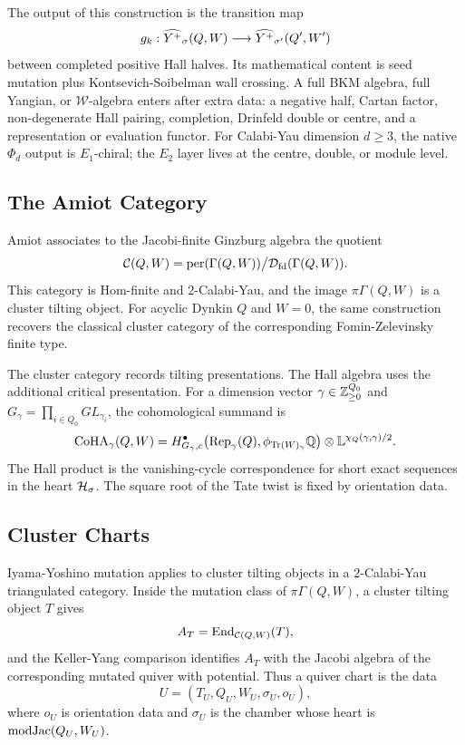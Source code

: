 The output of this construction is the transition map
\[
  g_k:
  \widehat{Y^{+}}_{\sigma}(Q,W)
  \longrightarrow
  \widehat{Y^{+}}_{\sigma'}(Q',W')
\]
between completed positive Hall halves.  Its mathematical content is
seed mutation plus Kontsevich-Soibelman wall crossing.  A full BKM
algebra, full Yangian, or $\mathcal W$-algebra enters after extra data:
a negative half, Cartan factor, non-degenerate Hall pairing, completion,
Drinfeld double or centre, and a representation or evaluation functor.
For Calabi-Yau dimension $d\geq3$, the native $\Phi_d$ output is
$E_1$-chiral; the $E_2$ layer lives at the centre, double, or module
level.

\subsection*{The Amiot Category}

Amiot associates to the Jacobi-finite Ginzburg algebra the quotient
\[
  \mathcal{C}(Q,W)=\mathrm{per}(\Gamma(Q,W))\big/\mathcal{D}_{\mathrm{fd}}(\Gamma(Q,W)).
\]
This category is Hom-finite and $2$-Calabi-Yau, and the image
$\pi\Gamma(Q,W)$ is a cluster tilting object.  For acyclic Dynkin $Q$
and $W=0$, the same construction recovers the classical cluster
category of the corresponding Fomin-Zelevinsky finite type.

The cluster category records tilting presentations.  The Hall algebra
uses the additional critical presentation.  For a dimension vector
$\gamma\in\mathbb{Z}_{\geq0}^{Q_0}$ and
$G_\gamma=\prod_{i\in Q_0}GL_{\gamma_i}$, the cohomological summand is
\[
  \mathrm{CoHA}_\gamma(Q,W)
  =
  H^{\bullet}_{G_\gamma,c}
  \bigl(\mathrm{Rep}_\gamma(Q),
  \phi_{\mathrm{Tr}(W)_\gamma}\mathbb Q\bigr)
  \otimes \mathbb L^{\chi_Q(\gamma,\gamma)/2}.
\]
The Hall product is the vanishing-cycle correspondence for short exact
sequences in the heart $\mathcal{H}_\sigma$.  The square root of the Tate twist
is fixed by orientation data.

\subsection*{Cluster Charts}

Iyama-Yoshino mutation applies to cluster tilting objects in a
$2$-Calabi-Yau triangulated category.  Inside the mutation class of
$\pi\Gamma(Q,W)$, a cluster tilting object $T$ gives
\[
  A_T=\mathrm{End}_{\mathcal{C}(Q,W)}(T),
\]
and the Keller-Yang comparison identifies $A_T$ with the Jacobi algebra
of the corresponding mutated quiver with potential.  Thus a quiver
chart is the data
\[
  U=(T_U,Q_U,W_U,\sigma_U,o_U),
\]
where $o_U$ is orientation data and $\sigma_U$ is the chamber whose
heart is $\mathrm{mod}\mathrm{Jac}(Q_U,W_U)$.

